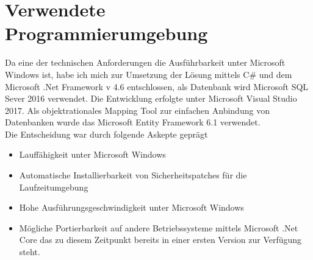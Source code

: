 \section{Verwendete Programmierumgebung}
Da eine der technischen Anforderungen die Ausführbarkeit unter Microsoft Windows ist, habe ich mich zur Umsetzung der Lösung mittels C\# und dem Microsoft .Net Framework v 4.6 entschlossen, als Datenbank wird Microsoft SQL Sever 2016 verwendet. Die Entwicklung erfolgte unter Microsoft Visual Studio 2017. Als objektrationales Mapping Tool zur einfachen Anbindung von Datenbanken wurde das Microsoft Entity Framework 6.1 verwendet.\\
Die Entscheidung war durch folgende Askepte geprägt
\begin{itemize}
	\item Lauffähigkeit unter Microsoft Windows
	\item Automatische Installierbarkeit von Sicherheitspatches für die Laufzeitumgebung
	\item Hohe Ausführungsgeschwindigkeit unter Microsoft Windows
	\item Mögliche Portierbarkeit auf andere Betriebssysteme mittels Microsoft .Net Core das zu diesem Zeitpunkt bereits in einer ersten Version zur Verfügung steht.
\end{itemize}
\chapterend
